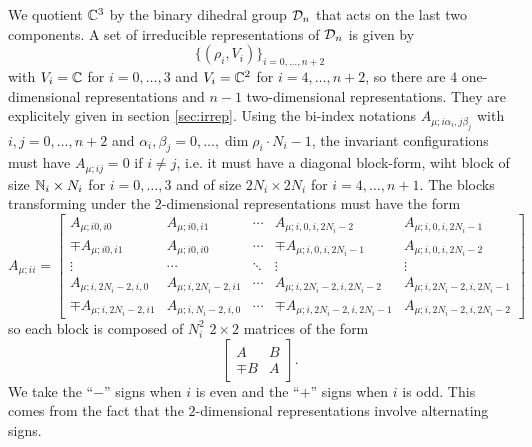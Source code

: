 \documentclass[a4paper,10pt]{article}
\begin{document}
        We quotient $\mathbb{C}^3$ by the binary dihedral group $\mathcal{D}_n$ that acts on the last two components. A set of irreducible representations of $\mathcal{D}_n$ is given by
        \begin{equation}
            \{(\rho_i,V_i)\}_{i=0,\dots,n+2}
        \end{equation}
        with $V_i=\mathbb{C}$ for $i=0,\dots,3$ and $V_i=\mathbb{C}^2$ for $i=4,\dots,n+2$, so there are $4$ one-dimensional representations and $n-1$ two-dimensional representations. They are explicitely given in section \ref{sec:irrep}. Using the bi-index notations $A_{\mu;i\alpha_i,j\beta_j}$ with $i,j=0,\dots,n+2$ and $\alpha_i,\beta_j=0,\dots,\dim\rho_i\cdot N_i-1$, the invariant configurations must have $A_{\mu;ij}=0$ if $i\neq j$, i.e. it must have a diagonal block-form, wiht block of size $\mathbb{N}_i\times N_i$ for $i=0,\dots,3$ and of size $2N_i\times 2N_i$ for $i=4,\dots,n+1$. The blocks transforming under the $2$-dimensional representations must have the form
        \begin{equation}
            A_{\mu;ii}=
            \begin{bmatrix}
                A_{\mu;i0,i0} & A_{\mu;i0,i1} & \cdots & A_{\mu;i,0,i,2N_i-2} & A_{\mu;i,0,i,2N_i-1} \\ 
                \mp A_{\mu;i0,i1} & A_{\mu;i0,i0} & \cdots & \mp A_{\mu;i,0,i,2N_i-1} & A_{\mu;i,0,i,2N_i-2} \\
                \vdots & \cdots & \ddots & \vdots & \vdots \\
                A_{\mu;i,2N_i-2,i,0} & A_{\mu;i,2N_i-2,i1} & \cdots & A_{\mu;i,2N_i-2,i,2N_i-2} & A_{\mu;i,2N_i-2,i,2N_i-1} \\ 
                \mp A_{\mu;i,2N_i-2,i1} & A_{\mu;i,N_i-2,i,0} & \cdots & \mp  A_{\mu;i,2N_i-2,i,2N_i-1} & A_{\mu;i,2N_i-2,i,2N_i-2}
            \end{bmatrix}
        \end{equation}
        so each block is composed of $N^2_i$ $2\times2$ matrices of the form
        \begin{equation}
            \begin{bmatrix}
                A & B \\
                \mp B & A
            \end{bmatrix}.
        \end{equation}
        We take the ``$-$'' signs when $i$ is even and the ``$+$'' signs when $i$ is odd. This comes from the fact that the $2$-dimensional representations involve alternating signs.
\end{document}
